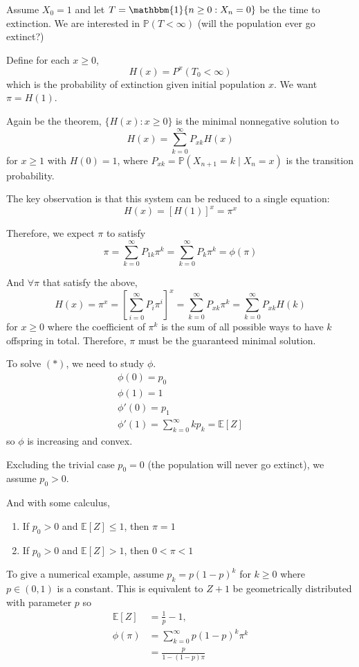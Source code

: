 \documentclass[12pt]{report}
\renewcommand{\P}{\mathbb{P}}
\newcommand{\E}{\mathbb{E}}
\newcommand{\ind}{\mathbbm{1}}
\begin{document}
    Assume $X_0 = 1$ and let $T = \ind\{n \geq 0: X_n = 0\}$ be the time to extinction. We are interested in $\P(T < \infty)$ (will the population ever go extinct?)

    Define for each $x \geq 0$, 
    \[H(x) = P^x(T_0 < \infty)\]
    which is the probability of extinction given initial population $x$. We want $\pi = H(1)$. 

    Again be the theorem, $\{H(x): x \geq 0\}$ is the minimal nonnegative solution to 
    \[H(x) = \sum_{k=0}^\infty P_{xk} H(x)\]
    for $x \geq 1$ with $H(0) = 1$, where $P_{xk} = \P(X_{n+1} = k \; | \; X_n = x)$ is the transition probability. 

    The key observation is that this system can be reduced to a single equation:
    \[H(x) = [H(1)]^x = \pi^x\]

    Therefore, we expect $\pi$ to satisfy 
    \[\pi = \sum_{k=0}^\infty P_{1k} \pi^k = \sum_{k=0}^\infty P_{k}\pi^k = \phi(\pi) \tag{*}\]

    And $\forall \pi$ that satisfy the above, 
    \[H(x) = \pi^x = \left[\sum_{i=0}^\infty P_i \pi^i\right]^x = \sum_{k=0}^\infty P_{xk} \pi^k = \sum_{k=0}^\infty P_{xk} H(k)\] 
    for $x \geq 0$ where the coefficient of $\pi^k$ is the sum of all possible ways to have $k$ offspring in total. Therefore, $\pi$ must be the guaranteed minimal solution.
    
    To solve $(*)$, we need to study $\phi$. 
    \begin{align*}
        \phi(0) = p_0\\ 
        \phi(1) = 1\\ 
        \phi'(0) = p_1\\ 
        \phi'(1) = \sum_{k=0}^\infty kp_k = \E[Z]
    \end{align*}
    so $\phi$ is increasing and convex. 
    
    Excluding the trivial case $p_0 = 0$ (the population will never go extinct), we assume $p_0 > 0$. 

    And with some calculus, 
    \begin{enumerate}
        \item If $p_0 > 0$ and $\E[Z] \leq 1$, then $\pi = 1$
        \item If $p_0 > 0$ and $\E[Z] > 1$, then $0 < \pi < 1$ 
    \end{enumerate}

    To give a numerical example, assume $p_k = p(1- p)^k$ for $k \geq 0$ where $p \in (0, 1)$ is a constant. This is equivalent to $Z +1$ be geometrically distributed with parameter $p$ so 
    \begin{align*}
        \E[Z] &= \frac{1}{p} - 1,\\ 
        \phi(\pi) &= \sum_{k=0}^\infty p(1- p)^k \pi^k\\ 
        &= \frac{p}{1 - (1 - p)\pi}
    \end{align*}
    
\end{document}
